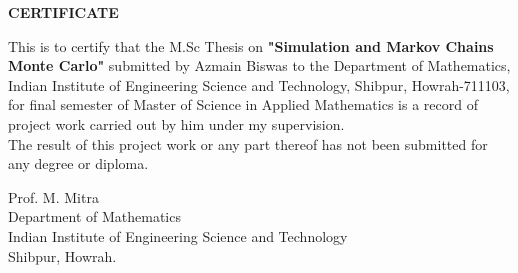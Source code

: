\vspace{10cm}
\begin{center}
    \LARGE{\textbf{CERTIFICATE}}
\end{center}
\vspace*{2cm}
This is to certify that the M.Sc Thesis on \textbf{"Simulation and Markov Chains Monte Carlo"} submitted by Azmain Biswas to the Department of Mathematics, Indian Institute of Engineering Science and Technology, Shibpur, Howrah-711103, for final semester of Master of Science in Applied Mathematics is a record of project work carried out by him under my supervision. \\
The result of this project work or any part thereof has not been submitted for any degree or diploma.
\vspace{4cm}
\begin{flushright}
    Prof. M. Mitra\\
    Department of Mathematics\\
    Indian Institute of Engineering Science and Technology\\
    Shibpur, Howrah.
\end{flushright}
